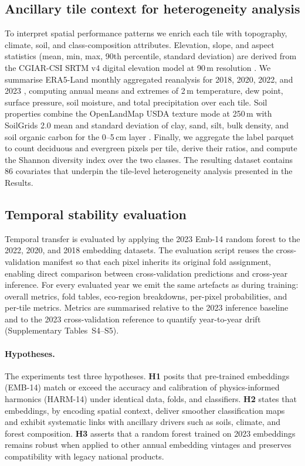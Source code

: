 \documentclass[utf8]{FrontiersinHarvard}
\begin{document}
\subsection{Ancillary tile context for heterogeneity analysis}
To interpret spatial performance patterns we enrich each tile with topography, climate, soil, and class-composition attributes. Elevation, slope, and aspect statistics (mean, min, max, 90th percentile, standard deviation) are derived from the CGIAR-CSI SRTM v4 digital elevation model at 90\,m resolution \citep{Jarvis2008SRTM}. We summarise ERA5-Land monthly aggregated reanalysis for 2018, 2020, 2022, and 2023 \citep{MunozSabater2021ERA5Land}, computing annual means and extremes of 2\,m temperature, dew point, surface pressure, soil moisture, and total precipitation over each tile. Soil properties combine the OpenLandMap USDA texture mode at 250\,m \citep{Hengl2021OpenLandMap} with SoilGrids 2.0 mean and standard deviation of clay, sand, silt, bulk density, and soil organic carbon for the 0–5\,cm layer \citep{Poggio2021SoilGrids}. Finally, we aggregate the label parquet to count deciduous and evergreen pixels per tile, derive their ratios, and compute the Shannon diversity index over the two classes. The resulting dataset contains 86 covariates that underpin the tile-level heterogeneity analysis presented in the Results.

\subsection{Temporal stability evaluation}
Temporal transfer is evaluated by applying the 2023 Emb-14 random forest to the 2022, 2020, and 2018 embedding datasets. The evaluation script reuses the cross-validation manifest so that each pixel inherits its original fold assignment, enabling direct comparison between cross-validation predictions and cross-year inference. For every evaluated year we emit the same artefacts as during training: overall metrics, fold tables, eco-region breakdowns, per-pixel probabilities, and per-tile metrics. Metrics are summarised relative to the 2023 inference baseline and to the 2023 cross-validation reference to quantify year-to-year drift (Supplementary Tables~S4–S5).

\paragraph{Hypotheses.} The experiments test three hypotheses. \textbf{H1} posits that pre-trained embeddings (EMB-14) match or exceed the accuracy and calibration of physics-informed harmonics (HARM-14) under identical data, folds, and classifiers. \textbf{H2} states that embeddings, by encoding spatial context, deliver smoother classification maps and exhibit systematic links with ancillary drivers such as soils, climate, and forest composition. \textbf{H3} asserts that a random forest trained on 2023 embeddings remains robust when applied to other annual embedding vintages and preserves compatibility with legacy national products.
\end{document}
